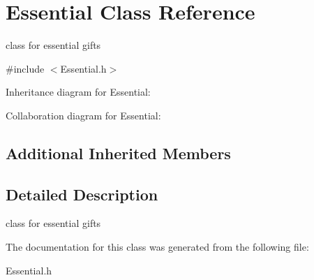 \hypertarget{classEssential}{}\section{Essential Class Reference}
\label{classEssential}


class for essential gifts  




{\ttfamily \#include $<$Essential.\+h$>$}



Inheritance diagram for Essential\+:


Collaboration diagram for Essential\+:
\subsection*{Additional Inherited Members}


\subsection{Detailed Description}
class for essential gifts 

The documentation for this class was generated from the following file\+:\begin{DoxyCompactItemize}
\item 
Essential.\+h\end{DoxyCompactItemize}
